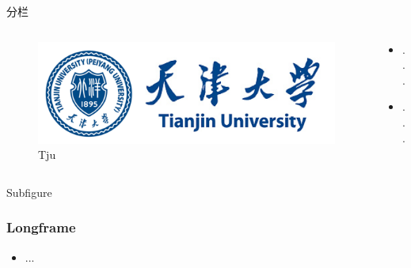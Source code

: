 \documentclass[hyperref,UTF8,11pt]{beamer}
\begin{document}
\begin{frame}{分栏}
    \begin{columns}
        \begin{column}{0.3\textwidth}
            \begin{figure}[H] %
                \centering
                \includegraphics[width=\textwidth]{tju_logo.png}
                \caption{Tju}\label{fig:tju}
            \end{figure}
        \end{column}
        \begin{column}{0.7\textwidth}
            \begin{itemize}
                \item ...
                \item ...
            \end{itemize}
        \end{column}
    \end{columns}
\end{frame}

\begin{frame}{Subfigure}
    \begin{figure}
        \centering
    \end{figure}
\end{frame}

\begin{frame}[allowframebreaks]
    \frametitle{Longframe}
    \begin{itemize}
        \item ...
    \end{itemize}
\end{frame}
\end{document}
